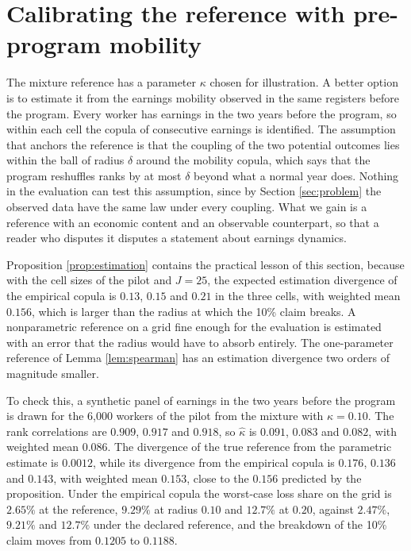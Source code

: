 \documentclass[11pt,a4paper]{article}
\theoremstyle{notesplain}
\theoremstyle{notesupright}
\numberwithin{equation}{section}
\begin{document}
\section{Calibrating the reference with pre-program mobility}
\label{sec:calibration}
The mixture reference has a parameter $\kappa$ chosen for illustration. A better option is to estimate it from the earnings mobility observed in the same registers before the program. Every worker has earnings in the two years before the program, so within each cell the copula of consecutive earnings is identified. The assumption that anchors the reference is that the coupling of the two potential outcomes lies within the ball of radius $\delta$ around the mobility copula, which says that the program reshuffles ranks by at most $\delta$ beyond what a normal year does. Nothing in the evaluation can test this assumption, since by Section \ref{sec:problem} the observed data have the same law under every coupling. What we gain is a reference with an economic content and an observable counterpart, so that a reader who disputes it disputes a statement about earnings dynamics.

Proposition \ref{prop:estimation} contains the practical lesson of this section, because with the cell sizes of the pilot and $J=25$, the expected estimation divergence of the empirical copula is $0.13$, $0.15$ and $0.21$ in the three cells, with weighted mean $0.156$, which is larger than the radius at which the 10\% claim breaks. A nonparametric reference on a grid fine enough for the evaluation is estimated with an error that the radius would have to absorb entirely. The one-parameter reference of Lemma \ref{lem:spearman} has an estimation divergence two orders of magnitude smaller.

To check this, a synthetic panel of earnings in the two years before the program is drawn for the 6,000 workers of the pilot from the mixture with $\kappa=0.10$. The rank correlations are $0.909$, $0.917$ and $0.918$, so $\hat\kappa$ is $0.091$, $0.083$ and $0.082$, with weighted mean $0.086$. The divergence of the true reference from the parametric estimate is $0.0012$, while its divergence from the empirical copula is $0.176$, $0.136$ and $0.143$, with weighted mean $0.153$, close to the $0.156$ predicted by the proposition. Under the empirical copula the worst-case loss share on the grid is $2.65\%$ at the reference, $9.29\%$ at radius $0.10$ and $12.7\%$ at $0.20$, against $2.47\%$, $9.21\%$ and $12.7\%$ under the declared reference, and the breakdown of the 10\% claim moves from $0.1205$ to $0.1188$.
\end{document}
